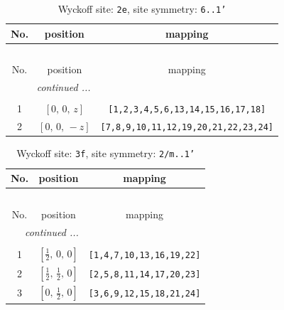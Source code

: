 \documentclass[fleqn,8pt]{jsarticle}
\begin{document}
\begin{longtable}{ccc}
\caption{Wyckoff site: {\tt 2e}, site symmetry: {\tt 6..1'}}
 \\
 \hline \hline
No. & position & mapping \\ \hline \endfirsthead

\multicolumn{2}{l}{\tablename\ \thetable{}} \\
 \hline \hline
No. & position & mapping \\ \hline \endhead

 \hline \hline
\multicolumn{2}{r}{\footnotesize\it continued ...} \\ \endfoot

 \hline \hline
\multicolumn{2}{r}{} \\ \endlastfoot

1 & $\left[ 0,\, 0,\, z \right]$ & {\tt [1,2,3,4,5,6,13,14,15,16,17,18]} \\ \hline
2 & $\left[ 0,\, 0,\, - z \right]$ & {\tt [7,8,9,10,11,12,19,20,21,22,23,24]} \\
\end{longtable}
\renewcommand{\arraystretch}{1.2}
\begin{longtable}{ccc}
\caption{Wyckoff site: {\tt 3f}, site symmetry: {\tt 2/m..1'}}
 \\
 \hline \hline
No. & position & mapping \\ \hline \endfirsthead

\multicolumn{2}{l}{\tablename\ \thetable{}} \\
 \hline \hline
No. & position & mapping \\ \hline \endhead

 \hline \hline
\multicolumn{2}{r}{\footnotesize\it continued ...} \\ \endfoot

 \hline \hline
\multicolumn{2}{r}{} \\ \endlastfoot

1 & $\left[ \frac{1}{2},\, 0,\, 0 \right]$ & {\tt [1,4,7,10,13,16,19,22]} \\ \hline
2 & $\left[ \frac{1}{2},\, \frac{1}{2},\, 0 \right]$ & {\tt [2,5,8,11,14,17,20,23]} \\ \hline
3 & $\left[ 0,\, \frac{1}{2},\, 0 \right]$ & {\tt [3,6,9,12,15,18,21,24]} \\
\end{longtable}
\renewcommand{\arraystretch}{1.2}
\end{document}
